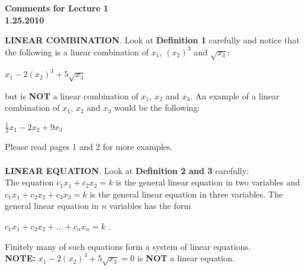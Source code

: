 \documentclass[12pt]{article}
\begin{document}
\begin{center}
{\large \bf Comments for Lecture 1}\\
\bf{1.25.2010}
\end{center}

{\bf LINEAR COMBINATION}.  Look at {\bf Definition 1} carefully and notice that the following is a linear combination of $x_1$, $(x_2)^3$ and $\sqrt{x_3}$:
\begin{center}
$x_1-2(x_2)^3+5\sqrt{x_3}$
\end{center}

but is {\bf NOT} a linear combination of $x_1$, $x_2$ and $x_3$.  An example of a linear combination of $x_1$, $x_2$ and $x_3$ would be the following:
\begin{center}
$\frac{1}{2}x_1-2x_2+9x_3$
\end{center}


Please read pages 1 and 2 for more examples.\\ \\

{\bf LINEAR EQUATION}.  Look at {\bf Definition 2 and 3} carefully:\\
The equation $c_1 x_1+ c_2 x_2= k$ is the general linear equation in two variables and $c_1 x_1+ c_2 x_2 + c_3 x_3= k$ is the general linear equation in three variables. The general linear equation in $n$ variables has the form
\begin{center} $c_1 x_1+ c_2 x_2 +\ldots+ c_n x_n= k$ . \end{center} Finitely many of such equations form a system of linear equations.\\

{\bf NOTE:} $x_1-2(x_2)^3+5\sqrt{x_3}=0$ is {\bf NOT} a linear equation.
\end{document}
